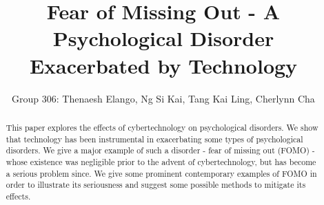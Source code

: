 \documentclass[a4paper,10pt]{article}
\title{Fear of Missing Out - A Psychological Disorder Exacerbated by Technology}
\author{Group 306: Thenaesh Elango, Ng Si Kai, Tang Kai Ling, Cherlynn Cha}
\date{}
\begin{document}
  
  \maketitle
  \newpage
  
  \begin{abstract}
    This paper explores the effects of cybertechnology on psychological disorders. We show that technology has been instrumental in exacerbating some types of psychological disorders. We give a major example of such a disorder - fear of missing out (FOMO) - whose existence was negligible prior to the advent of cybertechnology, but has become a serious problem since. We give some prominent contemporary examples of FOMO in order to illustrate its seriousness and suggest some possible methods to mitigate its effects.
  \end{abstract}
  \newpage
  
  \tableofcontents
  \newpage
  
  
  
  
  \newpage
  
  \newpage
  
  \newpage
  
  \newpage
  
  \newpage
  
  
  
  
\end{document}
